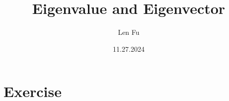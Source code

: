 \documentclass{article}
\title{Eigenvalue and Eigenvector}
\author{Len Fu}
\date{11.27.2024}
\theoremstyle{definition}
\newtheorem{exe}{Exercise}
\begin{document}
\maketitle

\tableofcontents

\newpage

\section{Exercise}
\end{document}
